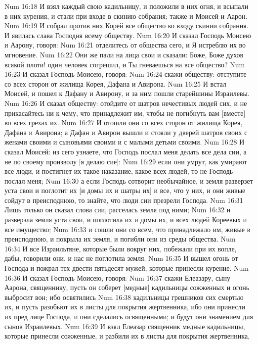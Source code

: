 \vs Num 16:18 И взял каждый свою кадильницу, и положили в них огня, и всыпали в них курения, и стали при входе в скинию собрания; также и Моисей и Аарон.
\vs Num 16:19 И собрал против них Корей все общество ко входу скинии собрания. И явилась слава Господня всему обществу.
\rsbpar\vs Num 16:20 И сказал Господь Моисею и Аарону, говоря:
\vs Num 16:21 отделитесь от общества сего, и Я истреблю их во мгновение.
\vs Num 16:22 Они же пали на лица свои и сказали: Боже, Боже духов всякой плоти! один человек согрешил, и Ты гневаешься на все общество?
\vs Num 16:23 И сказал Господь Моисею, говоря:
\vs Num 16:24 скажи обществу: отступите со всех сторон от жилища Корея, Дафана и Авирона.
\vs Num 16:25 И встал Моисей, и пошел к Дафану и Авирону, и за ним пошли старейшины Израилевы.
\vs Num 16:26 И сказал обществу: отойдите от шатров нечестивых людей сих, и не прикасайтесь ни к чему, что принадлежит им, чтобы не погибнуть вам [вместе] во всех грехах их.
\vs Num 16:27 И отошли они со всех сторон от жилища Корея, Дафана и Авирона; а Дафан и Авирон вышли и стояли у дверей шатров своих с женами своими и сыновьями своими и с малыми детьми своими.
\vs Num 16:28 И сказал Моисей: из сего узнаете, что Господь послал меня делать все дела сии, а не по своему произволу [я делаю сие]:
\vs Num 16:29 если они умрут, как умирают все люди, и постигнет их такое наказание, какое  всех людей, то не Господь послал меня;
\vs Num 16:30 а если Господь сотворит необычайное, и земля разверзет уста свои и поглотит их [и домы их и шатры их] и все, что у них, и они живые сойдут в преисподнюю, то знайте, что люди сии презрели Господа.
\vs Num 16:31 Лишь только он сказал слова сии, расселась земля под ними;
\vs Num 16:32 и разверзла земля уста свои, и поглотила их и домы их, и всех людей Кореевых и все имущество;
\vs Num 16:33 и сошли они со всем, что принадлежало им, живые в преисподнюю, и покрыла их земля, и погибли они из среды общества.
\vs Num 16:34 И все Израильтяне, которые были вокруг них, побежали при их вопле, дабы, говорили они, и нас не поглотила земля.
\vs Num 16:35 И вышел огонь от Господа и пожрал тех двести пятьдесят мужей, которые принесли курение.
\rsbpar\vs Num 16:36 И сказал Господь Моисею, говоря:
\vs Num 16:37 скажи Елеазару, сыну Аарона, священнику, пусть он соберет [медные] кадильницы сожженных и огонь выбросит вон; ибо освятились
\vs Num 16:38 кадильницы грешников сих смертью их, и пусть разобьют их в листы для покрытия жертвенника, ибо они принесли их пред лице Господа, и они сделались освященными; и будут они знамением для сынов Израилевых.
\vs Num 16:39 И взял Елеазар священник медные кадильницы, которые принесли сожженные, и разбили их в листы для покрытия жертвенника,
